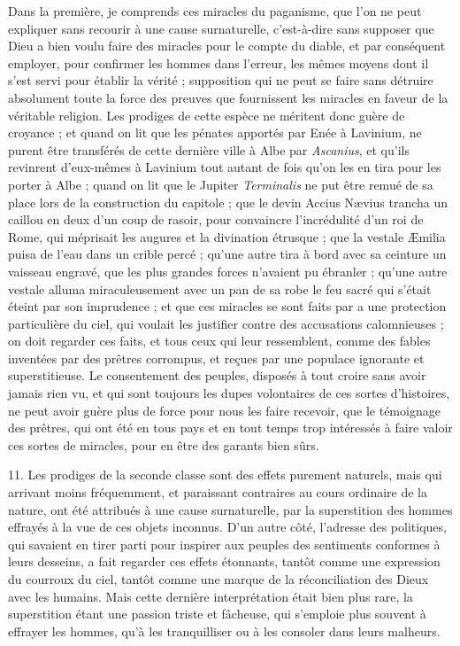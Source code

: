 \documentclass[a4paper, 11pt, oneside, polutonikogreek, french]{article}
\begin{document}
\og Dans la première, je comprends ces miracles du paganisme, que l'on ne peut expliquer sans recourir à une cause surnaturelle, c'est-à-dire sans supposer que Dieu a bien voulu faire des miracles pour le compte du diable, et par conséquent employer, pour confirmer les hommes dans l'erreur, les mêmes moyens dont il s'est servi pour établir la vérité ; supposition qui ne peut se faire sans détruire absolument toute la force des preuves que fournissent les miracles en faveur de la véritable religion. Les prodiges de cette espèce ne méritent donc guère de croyance ; et quand on lit que les pénates apportés par Enée à Lavinium, ne purent être transférés de cette dernière ville à Albe par \emph{Ascanius}, et qu'ils revinrent d'eux-mêmes à Lavinium tout autant de fois qu'on les en tira pour les porter à Albe ; quand on lit que le Jupiter \emph{Terminalis} ne put être remué de sa place lors de la construction du capitole ; que le devin Accius Nævius trancha un caillou en deux d'un coup de rasoir, pour convaincre l'incrédulité d'un roi de Rome, qui méprisait les augures et la divination étrusque ; que la vestale Æmilia puisa de l'eau dans un crible percé ; qu'une autre tira à bord avec sa ceinture un vaisseau engravé, que les plus grandes forces n'avaient pu ébranler ; qu'une autre vestale alluma miraculeusement avec un pan de sa robe le feu sacré qui s'était éteint par son imprudence ; et que ces miracles se sont faits par a une protection particulière du ciel, qui voulait les justifier contre des accusations calomnieuses ; on doit regarder ces faits, et tous ceux qui leur ressemblent, comme des fables inventées par des prêtres corrompus, et reçues par une populace ignorante et superstitieuse. Le consentement des peuples, disposés à tout croire sans avoir jamais rien vu, et qui sont toujours les dupes volontaires de ces sortes d'histoires, ne peut avoir guère plus de force pour nous les faire recevoir, que le témoignage des prêtres, qui ont été en tous pays et en tout temps trop intéressés à faire valoir ces sortes de miracles, pour en être des garants bien sûrs.

11. Les prodiges de la seconde classe sont des effets purement naturels, mais qui arrivant moins fréquemment, et paraissant contraires au cours ordinaire de la nature, ont été attribués à une cause surnaturelle, par la superstition des hommes effrayés à la vue de ces objets inconnus. D'un autre côté, l'adresse des politiques, qui savaient en tirer parti pour inspirer aux peuples des sentiments conformes à leurs desseins, a fait regarder ces effets étonnants, tantôt comme une expression du courroux du ciel, tantôt comme une marque de la réconciliation des Dieux avec les humains. Mais cette dernière interprétation était bien plus rare, la superstition étant une passion triste et fâcheuse, qui s'emploie plus souvent à effrayer les hommes, qu'à les tranquilliser ou à les consoler dans leurs malheurs.
\end{document}
